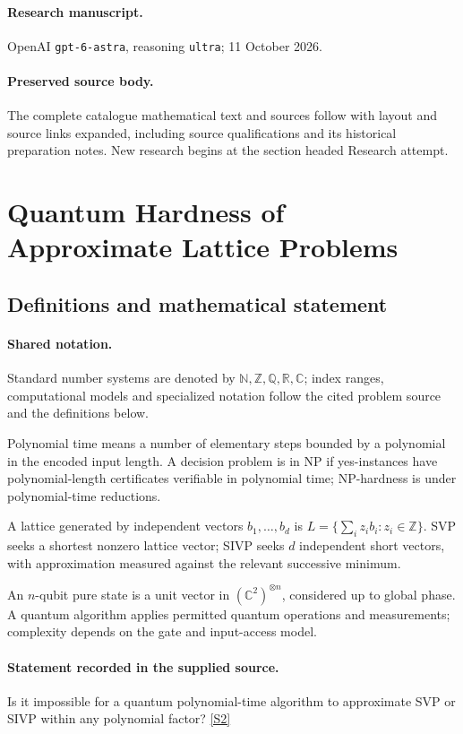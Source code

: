\documentclass[11pt]{article}
\begin{document}
\paragraph{Research manuscript.} OpenAI \texttt{gpt-6-astra}, reasoning \texttt{ultra}; 11 October 2026.
\paragraph{Preserved source body.} The complete catalogue mathematical text and sources follow with layout and source links expanded, including source qualifications and its historical preparation notes. New research begins at the section headed Research attempt.

\section{Quantum Hardness of Approximate Lattice Problems}\label{statement}

\subsection{Definitions and mathematical statement}

\paragraph{Shared notation.}Standard number systems are denoted by $\mathbb N,\mathbb Z,\mathbb Q,\mathbb R,\mathbb C$; index ranges, computational models and specialized notation follow the cited problem source and the definitions below.


Polynomial time means a number of elementary steps bounded by a polynomial in the encoded input length. A decision problem is in $\mathrm{NP}$ if yes-instances have polynomial-length certificates verifiable in polynomial time; NP-hardness is under polynomial-time reductions.

A lattice generated by independent vectors $b_1,\ldots,b_d$ is $L=\{\sum_i z_i b_i:z_i\in\mathbb Z\}$. SVP seeks a shortest nonzero lattice vector; SIVP seeks $d$ independent short vectors, with approximation measured against the relevant successive minimum.

An $n$-qubit pure state is a unit vector in $(\mathbb C^2)^{\otimes n}$, considered up to global phase. A quantum algorithm applies permitted quantum operations and measurements; complexity depends on the gate and input-access model.
\paragraph{Statement recorded in the supplied source.}
Is it impossible for a quantum polynomial-time algorithm to approximate SVP or SIVP within any polynomial factor? \href{https://doi.org/10.4171/owr/2005/26}{[S2]}
\end{document}
